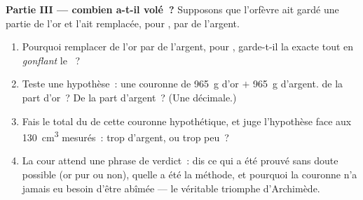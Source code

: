 \begin{problem}
\medskip\noindent\textbf{Partie III --- combien a-t-il volé~?}
Supposons que l'orfèvre ait gardé une partie de l'or et l'ait
remplacée,  pour , par de l'argent.
\begin{enumerate}[resume]
  \item Pourquoi remplacer de l'or par de l'argent,  pour
        , garde-t-il la  exacte tout en \emph{gonflant}
        le ~?
  \item Teste une hypothèse~: une couronne de \qty{965}{g} d'or $+$
        \qty{965}{g} d'argent.  de la part d'or~? De la part
        d'argent~? (Une décimale.)
  \item Fais le total du  de cette couronne hypothétique, et
        juge l'hypothèse face aux \qty{130}{cm^3} mesurés~: trop
        d'argent, ou trop peu~?
  \item La cour attend une phrase de verdict~: dis ce qui a été
        prouvé sans doute possible (or pur ou non), quelle a été la
        méthode, et pourquoi la couronne n'a jamais eu besoin d'être
        abîmée --- le véritable triomphe d'Archimède.
\end{enumerate}
\end{problem}
